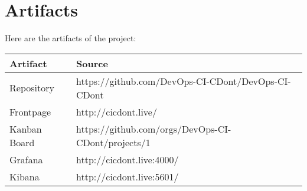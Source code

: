 \section{Artifacts}
Here are the artifacts of the project:

\begin{table}[H]
\begin{tabular}{|l|l|}
\hline
Artifact     & Source                                             \\ \hline
Repository   & https://github.com/DevOps-CI-CDont/DevOps-CI-CDont \\ \hline
Frontpage    & http://cicdont.live/                               \\ \hline
Kanban Board & https://github.com/orgs/DevOps-CI-CDont/projects/1 \\ \hline
Grafana      & http://cicdont.live:4000/                          \\ \hline
Kibana       & http://cicdont.live:5601/                          \\ \hline
\end{tabular}
\end{table}